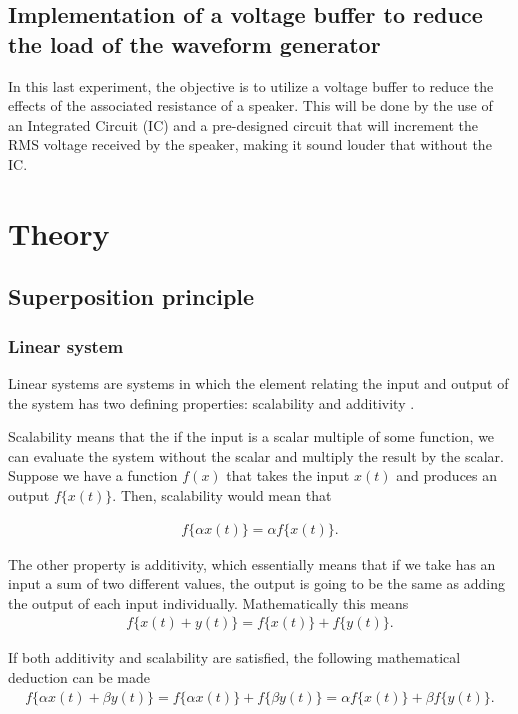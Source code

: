 \documentclass[english,12pt]{article}
\begin{document}
\subsection{Implementation of a voltage buffer to reduce the load of the waveform generator}

In this  last experiment, the objective is to utilize a voltage buffer to reduce the effects of the associated resistance of a speaker. This will be done by the use of an Integrated Circuit (IC) and a pre-designed circuit that will increment the RMS voltage received by the speaker, making it sound louder that without the IC.

\section{Theory}
\subsection{Superposition principle}
\subsubsection{Linear system}

Linear systems are systems in which the element relating the input and output of the system has two defining properties: scalability and additivity \parencite[54-56]{Balmos2019}.

Scalability means that the if the input is a scalar multiple of some function, we can evaluate the system without the scalar and multiply the result by the scalar. Suppose we have a function $f(x)$ that takes the input $x(t)$ and produces an output $f\{x(t)\}$. Then, scalability would mean that

\begin{align}
    f\{\alpha x(t)\} = \alpha f\{x(t)\}. \label{eq:1}
\end{align}

The other property is additivity, which essentially means that if we take has an input a sum of two different values, the output is going to be the same as adding the output of each input individually. Mathematically this means
\begin{align}
    f\{x(t) + y(t)\} = f\{x(t)\} + f\{y(t)\}. \label{eq:2}
\end{align}

If both additivity and scalability are satisfied, the following mathematical deduction can be made
\begin{align*}
    f\{\alpha x(t) + \beta y(t)\} = f\{\alpha x(t)\} + f\{\beta y(t)\} = \alpha f\{x(t)\} + \beta f\{y(t)\}.
\end{align*}
\end{document}
